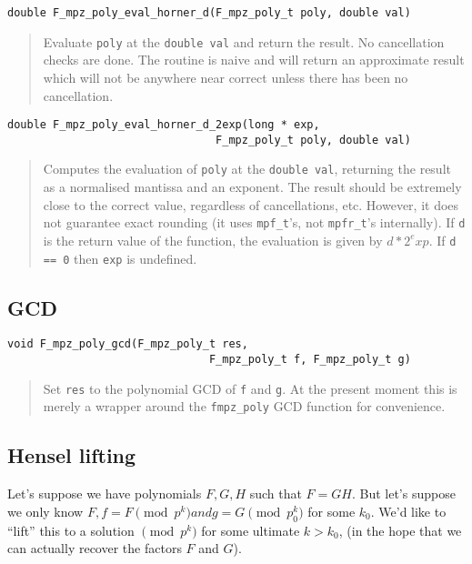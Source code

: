 \documentclass[a4paper,10pt]{article}
\newcommand{\code}{\lstinline}
\begin{document}
\begin{lstlisting}
double F_mpz_poly_eval_horner_d(F_mpz_poly_t poly, double val)
\end{lstlisting}
\begin{quote}
Evaluate \code{poly} at the \code{double val} and return the result. No cancellation checks are done. 
The routine is naive and will return an approximate result which will not be anywhere near correct 
unless there has been no cancellation.
\end{quote}

\begin{lstlisting}
double F_mpz_poly_eval_horner_d_2exp(long * exp, 
                                F_mpz_poly_t poly, double val)
\end{lstlisting}
\begin{quote}
Computes the evaluation of \code{poly} at the \code{double val}, returning the result as a normalised 
mantissa and an exponent. The result should be extremely close to the correct value, regardless of 
cancellations, etc. However, it does not guarantee exact rounding (it uses \code{mpf_t}'s, not 
\code{mpfr_t}'s internally). If \code{d} is the return value of the function, the evaluation is given 
by $d*2^exp$. If \code{d == 0} then \code{exp} is undefined.
\end{quote}

\subsection{GCD}

\begin{lstlisting}
void F_mpz_poly_gcd(F_mpz_poly_t res, 
                               F_mpz_poly_t f, F_mpz_poly_t g)
\end{lstlisting}
\begin{quote}
Set \code{res} to the polynomial GCD of \code{f} and \code{g}. At the present moment this is merely
a wrapper around the \code{fmpz_poly} GCD function for convenience.
\end{quote}

\subsection{Hensel lifting}

Let's suppose we have polynomials $F, G, H$ such that $F = GH$. But let's suppose we only know
$F, f = F \pmod{p^k} and g = G \pmod{p^k_0}$ for some $k_0$. We'd like to ``lift'' this to a solution
$\pmod{p^k}$ for some ultimate $k > k_0$, (in the hope that we can actually recover the factors $F$ 
and $G$).
\end{document}
